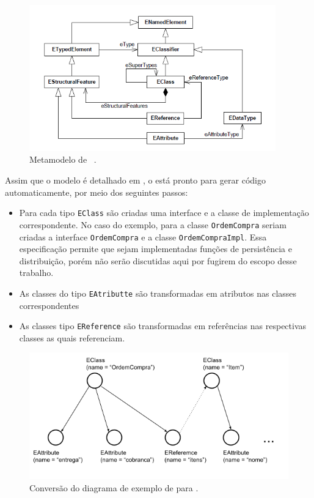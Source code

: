 \begin{figure}
	\centering
	\includegraphics[width=0.95\textwidth]{figuras/exemplos-emf/metamodelo-ecore.png}
	\caption{Metamodelo de \ecore~\cite{kern2008interchange}.}
	\label{metamodelo-ecore}
\end{figure}

Assim que o modelo é detalhado em \ecore, o \emf está pronto para gerar código automaticamente, por meio dos seguintes passos:

\begin{itemize}
	\item Para cada tipo \texttt{EClass} são criadas uma interface e a classe de implementação correspondente. No caso do exemplo, para a classe \texttt{OrdemCompra} seriam criadas a interface \texttt{OrdemCompra} e a classe \texttt{OrdemCompraImpl}. Essa especificação permite que sejam implementadas funções de persistência e distribuição, porém não serão discutidas aqui por fugirem do escopo desse trabalho.
	\item As classes do tipo \texttt{EAtributte} são transformadas em atributos nas classes correspondentes
	\item As classes tipo \texttt{EReference} são transformadas em referências nas respectivas classes as quais referenciam.
\end{itemize}

\begin{figure}
	\centering
	\includegraphics[width=1\textwidth]{figuras/exemplos-emf/uml-to-ecore.png}
	\caption{Conversão do diagrama de exemplo de \uml para \ecore.}
	\label{exemplo-uml-to-ecore}
\end{figure}

